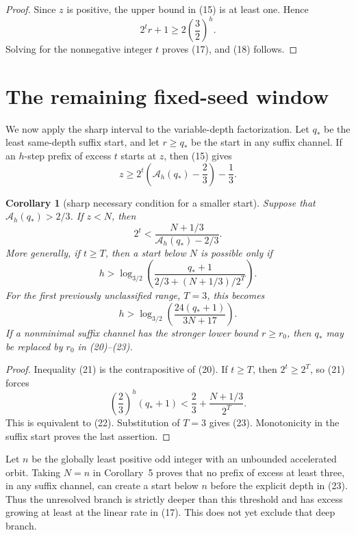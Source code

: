 \documentclass[11pt]{article}
\newtheorem{corollary}[theorem]{Corollary}
\begin{document}
\begin{proof}
Since $z$ is positive, the upper bound in (15) is at least one.  Hence
\[
 2^t r+1\geq2\left(\frac32\right)^h.
 \tag{19}
\]
Solving for the nonnegative integer $t$ proves (17), and (18) follows.
\end{proof}

\section{The remaining fixed-seed window}

We now apply the sharp interval to the variable-depth factorization.  Let
$q_*$ be the least same-depth suffix start, and let $r\geq q_*$ be the
start in any suffix channel.  If an $h$-step prefix of excess $t$ starts
at $z$, then (15) gives
\[
 z\geq
 2^t\left(\mathcal A_h(q_*)-\frac23\right)-\frac13.
 \tag{20}
\]

\begin{corollary}[sharp necessary condition for a smaller start]
Suppose that $\mathcal A_h(q_*)>2/3$.  If $z<N$, then
\[
 \boxed{
 2^t<
 \frac{N+1/3}{\mathcal A_h(q_*)-2/3}.}
 \tag{21}
\]
More generally, if $t\geq T$, then a start below $N$ is possible only if
\[
 \boxed{
 h>
 \log_{3/2}\left(
 \frac{q_*+1}{\displaystyle 2/3+(N+1/3)/2^T}
 \right).}
 \tag{22}
\]
For the first previously unclassified range, $T=3$, this becomes
\[
 \boxed{
 h>\log_{3/2}\left(\frac{24(q_*+1)}{3N+17}\right).}
 \tag{23}
\]
If a nonminimal suffix channel has the stronger lower bound $r\geq r_0$,
then $q_*$ may be replaced by $r_0$ in (20)--(23).
\end{corollary}

\begin{proof}
Inequality (21) is the contrapositive of (20).  If $t\geq T$, then
$2^t\geq2^T$, so (21) forces
\[
 \left(\frac23\right)^h(q_*+1)
 <\frac23+\frac{N+1/3}{2^T}.
 \tag{24}
\]
This is equivalent to (22).  Substitution of $T=3$ gives (23).
Monotonicity in the suffix start proves the last assertion.
\end{proof}

Let $n$ be the globally least positive odd integer with an unbounded
accelerated orbit.  Taking $N=n$ in Corollary~5 proves that no prefix of
excess at least three, in any suffix channel, can create a start below
$n$ before the explicit depth in (23).  Thus the unresolved branch is
strictly deeper than this threshold and has excess growing at least at
the linear rate in (17).  This does not yet exclude that deep branch.
\end{document}
